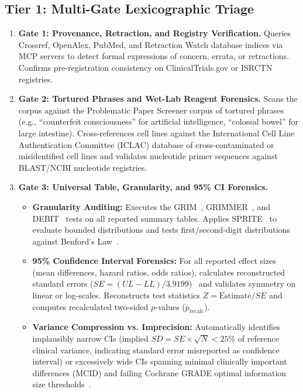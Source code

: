 \documentclass[11pt,a4paper]{article}
\begin{document}
\subsection{Tier 1: Multi-Gate Lexicographic Triage}
\begin{enumerate}
    \item \textbf{Gate 1: Provenance, Retraction, and Registry Verification.}
    Queries Crossref, OpenAlex, PubMed, and Retraction Watch database indices via MCP servers to detect formal expressions of concern, errata, or retractions. Confirms pre-registration consistency on ClinicalTrials.gov or ISRCTN registries.
    
    \item \textbf{Gate 2: Tortured Phrases and Wet-Lab Reagent Forensics.}
    Scans the corpus against the Problematic Paper Screener corpus of tortured phrases~\cite{cabanac2021tortured} (e.g., ``counterfeit consciousness'' for artificial intelligence, ``colossal bowel'' for large intestine). Cross-references cell lines against the International Cell Line Authentication Committee (ICLAC) database of cross-contaminated or misidentified cell lines and validates nucleotide primer sequences against BLAST/NCBI nucleotide registries.
    
    \item \textbf{Gate 3: Universal Table, Granularity, and 95\% CI Forensics.}
    \begin{itemize}
        \item \textbf{Granularity Auditing:} Executes the GRIM~\cite{brown2017grim}, GRIMMER~\cite{allard2018grimmer}, and DEBIT~\cite{heathers2019debit} tests on all reported summary tables. Applies SPRITE~\cite{heathers2018sprite} to evaluate bounded distributions and tests first/second-digit distributions against Benford's Law~\cite{benford1938law}.
        \item \textbf{95\% Confidence Interval Forensics:} For all reported effect sizes (mean differences, hazard ratios, odds ratios), calculates reconstructed standard errors ($SE = (UL - LL) / 3.9199$)~\cite{altman2011confidence} and validates symmetry on linear or log-scales. Reconstructs test statistics $Z = \text{Estimate} / SE$ and computes recalculated two-sided $p$-values ($p_{\text{recalc}}$).
        \item \textbf{Variance Compression vs. Imprecision:} Automatically identifies implausibly narrow CIs ($\text{implied } SD = SE \times \sqrt{N} < 25\%$ of reference clinical variance, indicating standard error misreported as confidence interval) or excessively wide CIs spanning minimal clinically important differences (MCID) and failing Cochrane GRADE optimal information size thresholds~\cite{guyatt2011grade}.
    \end{itemize}
    

\end{enumerate}
\end{document}
